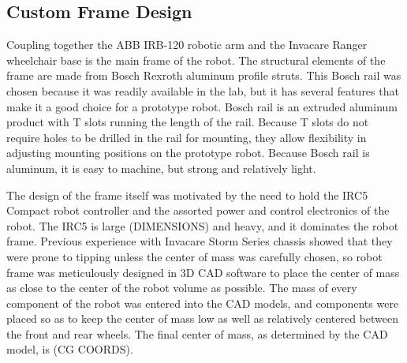 \documentclass{cwru}
\begin{document}
\subsection[Custom Frame Design]{Custom Frame Design}
Coupling together the ABB IRB-120 robotic arm and the Invacare Ranger wheelchair base is the main frame of the robot. The structural elements of the frame are made from Bosch Rexroth aluminum profile struts. This Bosch rail was chosen because it was readily available in the lab, but it has several features that make it a good choice for a prototype robot. Bosch rail is an extruded aluminum product with T slots running the length of the rail. Because T slots do not require holes to be drilled in the rail for mounting, they allow flexibility in adjusting mounting positions on the prototype robot. Because Bosch rail is aluminum, it is easy to machine, but strong and relatively light.

The design of the frame itself was motivated by the need to hold the IRC5 Compact robot controller and the assorted power and control electronics of the robot. The IRC5 is large (DIMENSIONS) and heavy, and it dominates the robot frame. Previous experience with Invacare Storm Series chassis showed that they were prone to tipping unless the center of mass was carefully chosen, so robot frame was meticulously designed in 3D CAD software to place the center of mass as close to the center of the robot volume as possible. The mass of every component of the robot was entered into the CAD models, and components were placed so as to keep the center of mass low as well as relatively centered between the front and rear wheels. The final center of mass, as determined by the CAD model, is (CG COORDS).
\end{document}
